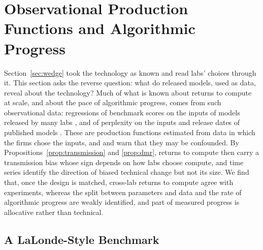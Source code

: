 
\section{Observational Production Functions and Algorithmic Progress}\label{sec:obs}

Section~\ref{sec:wedge} took the technology as known and read labs' choices through it. This section asks the reverse
question: what do released models, used as data, reveal about the technology? Much of what is known about returns to
compute at scale, and about the pace of algorithmic progress, comes from such observational data: regressions of benchmark scores on the inputs of models released by many labs
\citep{ruan2024observational,maiapolo2024sloth,owen2024predictable,mertens2026secret}, and of perplexity on the inputs
and release dates of published models \citep{ho2024algorithmic}. These are production functions estimated from data in
which the firms chose the inputs, and \citet{whitfill2025note} and \citet{konig2026validity} warn that they may be
confounded. By Propositions~\ref{prop:transmission} and \ref{prop:dmr}, returns to compute then carry a transmission
bias whose sign depends on how labs choose compute, and time series identify the direction of biased technical change
but not its size. We find that, once the design is matched, cross-lab returns to compute agree with
experiments, whereas the split between parameters and data and the rate of algorithmic progress are weakly identified,
and part of measured progress is allocative rather than technical.

\subsection{A LaLonde-Style Benchmark}

